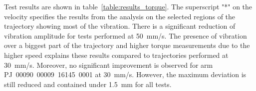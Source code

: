 
Test results are shown in table~\ref{table:results_torque}. The superscript "*" on the velocity specifies the results from the analysis on the selected regions of the trajectory showing most of the vibration. There is a significant reduction of vibration amplitude for tests performed at 50~mm/s. The presence of vibration over a biggest part of the trajectory and higher torque measurements due to the higher speed explains these results compared to trajectories performed at 30~mm/s. Moreover, no significant improvement is observed for arm PJ~00090~00009~16145~0001 at 30~mm/s. However, the maximum deviation is still reduced and contained under 1.5~mm for all tests.

